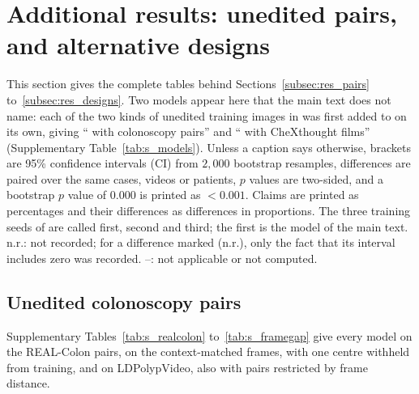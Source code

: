
\section{Additional results: unedited pairs, \texorpdfstring{\msn}{MedScope-4B-N} and alternative designs}
\label{sec:s_results_b}

This section gives the complete tables behind Sections~\ref{subsec:res_pairs} to~\ref{subsec:res_designs}. Two models appear here that the main text does not name: each of the two kinds of unedited training images in \msn{} was first added to \msp{} on its own, giving ``\msp{} with colonoscopy pairs'' and ``\msp{} with CheXthought films'' (Supplementary Table~\ref{tab:s_models}). Unless a caption says otherwise, brackets are 95\% confidence intervals (CI) from $2{,}000$ bootstrap resamples, differences are paired over the same cases, videos or patients, $p$ values are two-sided, and a bootstrap $p$ value of $0.000$ is printed as $<0.001$. Claims are printed as percentages and their differences as differences in proportions. The three training seeds of \msn{} are called first, second and third; the first is the model of the main text. n.r.: not recorded; for a difference marked (n.r.), only the fact that its interval includes zero was recorded. --: not applicable or not computed.

\subsection{Unedited colonoscopy pairs}
\label{subsec:s_pairs}

Supplementary Tables~\ref{tab:s_realcolon} to~\ref{tab:s_framegap} give every model on the REAL-Colon pairs, on the context-matched frames, with one centre withheld from training, and on LDPolypVideo, also with pairs restricted by frame distance.

